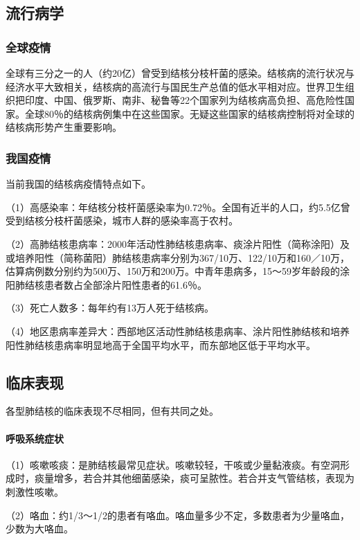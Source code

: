 \subsection{流行病学}

\subsubsection{全球疫情}

全球有三分之一的人（约20亿）曾受到结核分枝杆菌的感染。结核病的流行状况与经济水平大致相关，结核病的高流行与国民生产总值的低水平相对应。世界卫生组织把印度、中国、俄罗斯、南非、秘鲁等22个国家列为结核病高负担、高危险性国家。全球80％的结核病例集中在这些国家。无疑这些国家的结核病控制将对全球的结核病形势产生重要影响。

\subsubsection{我国疫情}

当前我国的结核病疫情特点如下。

（1）高感染率：年结核分枝杆菌感染率为0.72％。全国有近半的人口，约5.5亿曾受到结核分枝杆菌感染，城市人群的感染率高于农村。

（2）高肺结核患病率：2000年活动性肺结核患病率、痰涂片阳性（简称涂阳）及或培养阳性（简称菌阳）肺结核患病率分别为367/10万、122/10万和160／10万，估算病例数分别约为500万、150万和200万。中青年患病多，15～59岁年龄段的涂阳肺结核患者数占全部涂片阳性患者的61.6％。

（3）死亡人数多：每年约有13万人死于结核病。

（4）地区患病率差异大：西部地区活动性肺结核患病率、涂片阳性肺结核和培养阳性肺结核患病率明显地高于全国平均水平，而东部地区低于平均水平。

\subsection{临床表现}

各型肺结核的临床表现不尽相同，但有共同之处。
\paragraph{呼吸系统症状}

（1）咳嗽咳痰：是肺结核最常见症状。咳嗽较轻，干咳或少量黏液痰。有空洞形成时，痰量增多，若合并其他细菌感染，痰可呈脓性。若合并支气管结核，表现为刺激性咳嗽。

（2）咯血：约1/3～1/2的患者有咯血。咯血量多少不定，多数患者为少量咯血，少数为大咯血。

